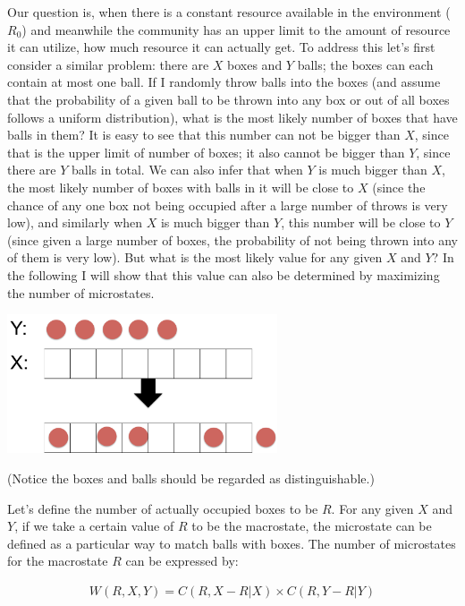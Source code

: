 \documentclass[12pt]{article}
\begin{document}
Our question is, when there is a constant resource available in the environment ($R_0$) and meanwhile the community has an upper limit to the amount of resource it can utilize, how much resource it can actually get. To address this let's first consider a similar problem: there are $X$ boxes and $Y$ balls; the boxes can each contain at most one ball. If I randomly throw balls into the boxes (and assume that the probability of a given ball to be thrown into any box or out of all boxes follows a uniform distribution), what is the most likely number of boxes that have balls in them? It is easy to see that this number can not be bigger than $X$, since that is the upper limit of number of boxes; it also cannot be bigger than $Y$, since there are $Y$ balls in total. We can also infer that when $Y$ is much bigger than $X$, the most likely number of boxes with balls in it will be close to $X$ (since the chance of any one box not being occupied after a large number of throws is very low), and similarly when $X$ is much bigger than $Y$, this number will be close to $Y$ (since given a large number of boxes, the probability of not being thrown into any of them is very low). But what is the most likely value for any given $X$ and $Y$? In the following I will show that this value can also be determined by maximizing the number of microstates.

\includegraphics[width=0.6\textwidth]{XY_demo.pdf}

(Notice the boxes and balls should be regarded as distinguishable.)

Let's define the number of actually occupied boxes to be $R$. For any given $X$ and $Y$, if we take a certain value of $R$ to be the macrostate, the microstate can be defined as a particular way to match balls with boxes. The number of microstates for the macrostate $R$ can be expressed by:
 
  \begin{equation}
 \begin{split}
W(R,X,Y) = C(R,X-R|X) \times C(R,Y-R|Y)
\end{split}
\end{equation}
\end{document}
